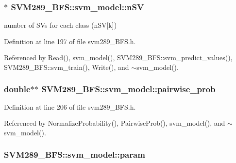 \subsubsection[{\texorpdfstring{n\+SV}{nSV}}]{$\ast$ S\+V\+M289\+\_\+\+B\+F\+S\+::svm\+\_\+model\+::n\+SV}\hypertarget{struct_s_v_m289___b_f_s_1_1svm__model_a4bb18b0f8425add0fd0cede41fac9d00}{}\label{struct_s_v_m289___b_f_s_1_1svm__model_a4bb18b0f8425add0fd0cede41fac9d00}
number of S\+Vs for each class (n\+SV\mbox{[}k\mbox{]}) 

Definition at line 197 of file svm289\+\_\+\+B\+F\+S.\+h.



Referenced by Read(), svm\+\_\+model(), S\+V\+M289\+\_\+\+B\+F\+S\+::svm\+\_\+predict\+\_\+values(), S\+V\+M289\+\_\+\+B\+F\+S\+::svm\+\_\+train(), Write(), and $\sim$svm\+\_\+model().

\subsubsection[{\texorpdfstring{pairwise\+\_\+prob}{pairwise_prob}}]{\setlength{\rightskip}{0pt plus 5cm}double$\ast$$\ast$ S\+V\+M289\+\_\+\+B\+F\+S\+::svm\+\_\+model\+::pairwise\+\_\+prob}\hypertarget{struct_s_v_m289___b_f_s_1_1svm__model_ad3030e40fd73b4b3ba65e6af7e0c32c7}{}\label{struct_s_v_m289___b_f_s_1_1svm__model_ad3030e40fd73b4b3ba65e6af7e0c32c7}


Definition at line 206 of file svm289\+\_\+\+B\+F\+S.\+h.



Referenced by Normalize\+Probability(), Pairwise\+Prob(), svm\+\_\+model(), and $\sim$svm\+\_\+model().

\subsubsection[{\texorpdfstring{param}{param}}]{ S\+V\+M289\+\_\+\+B\+F\+S\+::svm\+\_\+model\+::param}\hypertarget{struct_s_v_m289___b_f_s_1_1svm__model_a5684e91641a9f3187d45bf5cfa684228}{}\label{struct_s_v_m289___b_f_s_1_1svm__model_a5684e91641a9f3187d45bf5cfa684228}


